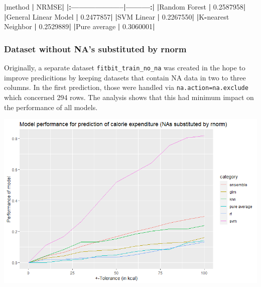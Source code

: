 \documentclass[
]{article}
\newenvironment{Shaded}{\begin{snugshade}}{\end{snugshade}}
\newcommand{\ErrorTok}[1]{\textcolor[rgb]{0.64,0.00,0.00}{\textbf{#1}}}
\newcommand{\FloatTok}[1]{\textcolor[rgb]{0.00,0.00,0.81}{#1}}
\newcommand{\NormalTok}[1]{#1}
\newcommand{\OperatorTok}[1]{\textcolor[rgb]{0.81,0.36,0.00}{\textbf{#1}}}
\newcommand{\StringTok}[1]{\textcolor[rgb]{0.31,0.60,0.02}{#1}}
\begin{document}
\begin{Shaded}
\begin{Highlighting}[]
\OperatorTok{|}\NormalTok{method               }\OperatorTok{|}\StringTok{     }\NormalTok{NRMSE}\OperatorTok{|}
\ErrorTok{|:}\OperatorTok{--------------------}\ErrorTok{|}\OperatorTok{---------}\ErrorTok{:|}
\ErrorTok{|}\NormalTok{Random Forest        }\OperatorTok{|}\StringTok{ }\FloatTok{0.2587958}\OperatorTok{|}
\ErrorTok{|}\NormalTok{General Linear Model }\OperatorTok{|}\StringTok{ }\FloatTok{0.2477857}\OperatorTok{|}
\ErrorTok{|}\NormalTok{SVM Linear           }\OperatorTok{|}\StringTok{ }\FloatTok{0.2267550}\OperatorTok{|}
\ErrorTok{|}\NormalTok{K}\OperatorTok{-}\NormalTok{nearest Neighbor   }\OperatorTok{|}\StringTok{ }\FloatTok{0.2529889}\OperatorTok{|}
\ErrorTok{|}\NormalTok{Pure average         }\OperatorTok{|}\StringTok{ }\FloatTok{0.3060001}\OperatorTok{|}
\end{Highlighting}
\end{Shaded}

\hypertarget{dataset-without-nas-substituted-by-rnorm}{%
\subsubsection{Dataset without NA's substituted by
rnorm}\label{dataset-without-nas-substituted-by-rnorm}}

Originally, a separate dataset \texttt{fitbit\_train\_no\_na} was
created in the hope to improve predicitions by keeping datasets that
contain NA data in two to three columns. In the first prediction, those
were handled via \texttt{na.action=na.exclude} which concerned 294 rows.
The analysis shows that this had minimum impact on the performance of
all models.

\includegraphics{./853f95ba287983e0cbab1a223bfd4b93b1858d68.png}
\end{document}
